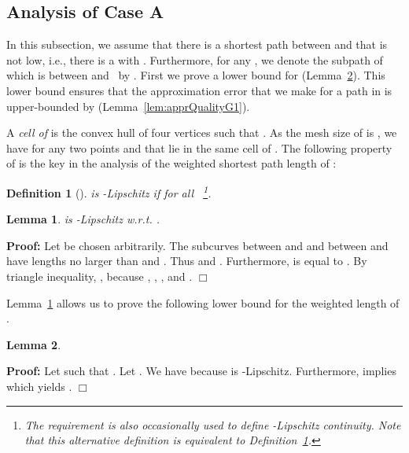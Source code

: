 \documentclass[a4paper,11pt]{article}
\newtheorem{definition}{Definition}
\newtheorem{lemma}{Lemma}
\newenvironment{proof}{\textbf{Proof:}}{\hspace*{0mm}\hfill\ensuremath{\Box}}
\begin{document}
\subsection{Analysis of Case A}\label{subsubsec:anaG1} 

	In this subsection, we assume that there is a shortest path  between  and  that is not low, i.e., there is a  with . Furthermore, for any , we denote the subpath of~ which is between  and~ by . 
First we prove a lower bound for  (Lemma~\ref{lem:lowerBoundForSummedFDcase1}). This lower bound ensures that the approximation error that we make for a path in  is upper-bounded by  (Lemma~\ref{lem:apprQualityG1}).

A \emph{cell  of } is the convex hull of four vertices  such that . As the mesh size of  is , we have  for any two points  and  that lie in the same cell of . The following property of  is the key in the analysis of the weighted shortest path length of :

\begin{definition}[\cite{funke:smooth}]\label{def:lip}
		 is -Lipschitz if  for all ~\footnote{The requirement  is also occasionally used to define -Lipschitz continuity. Note that this alternative definition is equivalent to Definition~\ref{def:lip}.}.
	\end{definition}

\begin{lemma}\label{lem:lip}
	 is -Lipschitz w.r.t. .
\end{lemma}
\begin{proof}
	Let  be chosen arbitrarily. The subcurves  between  and  and  between  and  have lengths no larger than  and . Thus  and . Furthermore,  is equal to . By triangle inequality,  , because , , , and . \end{proof}

	Lemma~\ref{lem:lip} allows us to prove the following lower bound for the weighted length of .

\begin{lemma}\label{lem:lowerBoundForSummedFDcase1}
	
\end{lemma}
\begin{proof}
	Let  such that . Let . We have  because  is -Lipschitz. Furthermore,  implies  which yields .
\end{proof}
\end{document}
